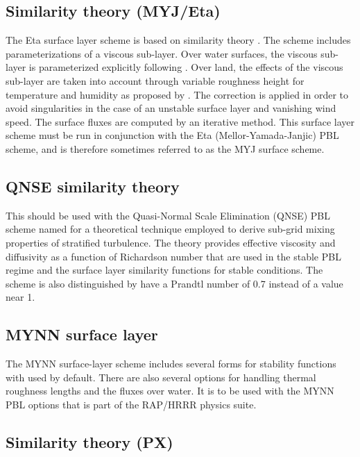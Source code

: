 \subsection{Similarity theory (MYJ/Eta)}

The Eta surface layer scheme \citep{janjic96,janjic02} is based 
on similarity theory \citep{monin54}. The scheme 
includes parameterizations of a viscous sub-layer. Over water surfaces, the 
viscous sub-layer is parameterized explicitly following \citet{janjic94}. 
Over land, the effects of the viscous sub-layer are taken into account 
through variable roughness height for temperature and humidity as proposed by 
\citet{zilit95}. The \citet{beljaars94} correction is applied in order 
to avoid singularities in the case of an unstable surface layer and vanishing 
wind speed. The surface fluxes are computed by an iterative method. 
This surface layer scheme must be run in conjunction with the Eta
(Mellor-Yamada-Janjic) PBL scheme, and is therefore sometimes referred to
as the MYJ surface scheme.

\subsection{QNSE similarity theory}

This should be used with the Quasi-Normal Scale Elimination (QNSE) PBL scheme
\citep{sukoriansky05} named for a theoretical technique employed to derive sub-grid
mixing properties of stratified turbulence. The theory provides effective viscosity and
diffusivity as a function of Richardson number that are used in the stable PBL regime
and the surface layer similarity functions for stable conditions. The scheme is also
distinguished by have a Prandtl number of 0.7 instead of a value near 1. 

\subsection{MYNN surface layer}

The MYNN surface-layer scheme includes  several forms for stability functions with \citet{dyer70}
used by default. There are also several options for handling thermal roughness lengths and the 
fluxes over water. It is to be used with the MYNN PBL options that is part of the RAP/HRRR physics
suite.

\subsection{Similarity theory (PX)}

